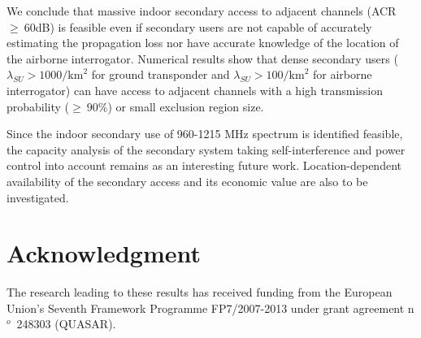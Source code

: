 \documentclass[12pt,submission,journal,onecolumn]{IEEEtran}
\begin{document}
We conclude that massive indoor secondary access to adjacent channels (ACR~$\geq~60$dB) is feasible even if secondary users are not capable of accurately estimating the propagation loss nor have accurate knowledge of the location of the airborne interrogator. Numerical results show that dense secondary users ($\lambda_{SU}>1000/\textrm{km}^2$ for ground transponder and $\lambda_{SU}>100/\textrm{km}^2$ for airborne interrogator) can have access to adjacent channels with a high transmission probability ($\geq~90\%$) or small exclusion region size. 

Since the indoor secondary use of 960-1215 MHz spectrum is identified feasible, the capacity analysis of the secondary system taking self-interference and power control into account remains as an interesting future work. Location-dependent availability of the secondary access and its economic value are also to be investigated.

\section*{Acknowledgment}
The research leading to these results has received funding from the European Union's Seventh Framework Programme FP7/2007-2013 under grant agreement n$^o$~248303 (QUASAR). 



\end{document}
